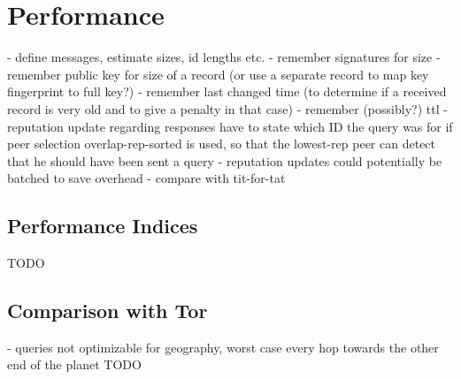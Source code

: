 \chapter{Performance}
- define messages, estimate sizes, id lengths etc.
    - remember signatures for size
    - remember public key for size of a record (or use a separate record to map
      key fingerprint to full key?)
    - remember last changed time (to determine if a received record is very old
      and to give a penalty in that case)
    - remember (possibly?) ttl
    - reputation update regarding responses have to state which ID the query was
      for if peer selection overlap-rep-sorted is used, so that the lowest-rep
      peer can detect that he should have been sent a query
- reputation updates could potentially be batched to save overhead
- compare with tit-for-tat
\section{Performance Indices}
TODO
\section{Comparison with Tor}
- queries not optimizable for geography, worst case every hop towards the other
  end of the planet
TODO
